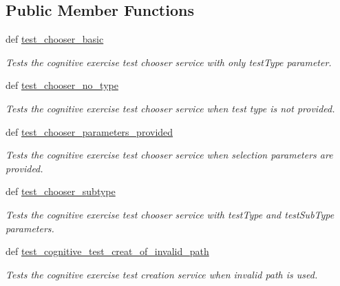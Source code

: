 \subsection*{Public Member Functions}
\begin{DoxyCompactItemize}
\item 
def \hyperlink{classcognitive__exercise__system__services__functional__tests_1_1CognitiveExerciseFunc_a287a720d8fbe9a1a2f375cae695353ab}{test\-\_\-chooser\-\_\-basic}
\begin{DoxyCompactList}\small\item\em Tests the cognitive exercise test chooser service with only test\-Type parameter. \end{DoxyCompactList}\item 
def \hyperlink{classcognitive__exercise__system__services__functional__tests_1_1CognitiveExerciseFunc_a40cbd2c6dee3d8c707e470663c09c86f}{test\-\_\-chooser\-\_\-no\-\_\-type}
\begin{DoxyCompactList}\small\item\em Tests the cognitive exercise test chooser service when test type is not provided. \end{DoxyCompactList}\item 
def \hyperlink{classcognitive__exercise__system__services__functional__tests_1_1CognitiveExerciseFunc_abe2326ad7ef70b211dc9400048633dd2}{test\-\_\-chooser\-\_\-parameters\-\_\-provided}
\begin{DoxyCompactList}\small\item\em Tests the cognitive exercise test chooser service when selection parameters are provided. \end{DoxyCompactList}\item 
def \hyperlink{classcognitive__exercise__system__services__functional__tests_1_1CognitiveExerciseFunc_ad40641b35afc54e350857da01da242e0}{test\-\_\-chooser\-\_\-subtype}
\begin{DoxyCompactList}\small\item\em Tests the cognitive exercise test chooser service with test\-Type and test\-Sub\-Type parameters. \end{DoxyCompactList}\item 
def \hyperlink{classcognitive__exercise__system__services__functional__tests_1_1CognitiveExerciseFunc_ab6db4f7fac5b335a4d36be8a85a9448e}{test\-\_\-cognitive\-\_\-test\-\_\-creat\-\_\-of\-\_\-invalid\-\_\-path}
\begin{DoxyCompactList}\small\item\em Tests the cognitive exercise test creation service when invalid path is used. \end{DoxyCompactList}\item 

\end{DoxyCompactItemize}
